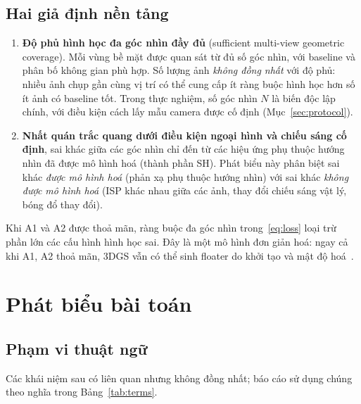 \documentclass[11pt,a4paper]{article}
\begin{document}
\subsection{Hai giả định nền tảng}
\label{sec:assumptions}
\begin{enumerate}[label=\textbf{A\arabic*.}]
  \item \textbf{Độ phủ hình học đa góc nhìn đầy đủ} (sufficient multi-view geometric coverage). Mỗi vùng bề mặt được quan sát từ đủ số góc nhìn, với baseline và phân bố không gian phù hợp. Số lượng ảnh \emph{không đồng nhất} với độ phủ: nhiều ảnh chụp gần cùng vị trí có thể cung cấp ít ràng buộc hình học hơn số ít ảnh có baseline tốt. Trong thực nghiệm, số góc nhìn $N$ là biến độc lập chính, với điều kiện cách lấy mẫu camera được cố định (Mục~\ref{sec:protocol}).
  \item \textbf{Nhất quán trắc quang dưới điều kiện ngoại hình và chiếu sáng cố định}, sai khác giữa các góc nhìn chỉ đến từ các hiệu ứng phụ thuộc hướng nhìn đã được mô hình hoá (thành phần SH). Phát biểu này phân biệt sai khác \emph{được mô hình hoá} (phản xạ phụ thuộc hướng nhìn) với sai khác \emph{không được mô hình hoá} (ISP khác nhau giữa các ảnh, thay đổi chiếu sáng vật lý, bóng đổ thay đổi).
\end{enumerate}
Khi A1 và A2 được thoả mãn, ràng buộc đa góc nhìn trong~\eqref{eq:loss} loại trừ phần lớn các cấu hình hình học sai. Đây là một mô hình đơn giản hoá: ngay cả khi A1, A2 thoả mãn, 3DGS vẫn có thể sinh floater do khởi tạo và mật độ hoá~\cite{adgs}.

\section{Phát biểu bài toán}
\label{sec:problem}

\subsection{Phạm vi thuật ngữ}
\label{sec:terms}
Các khái niệm sau có liên quan nhưng không đồng nhất; báo cáo sử dụng chúng theo nghĩa trong Bảng~\ref{tab:terms}.
\end{document}
